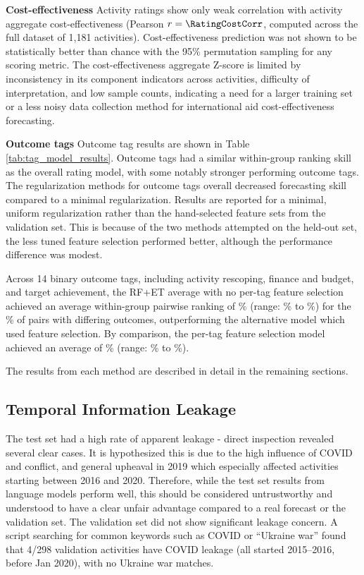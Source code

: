 \textbf{Cost-effectiveness} Activity ratings show only weak correlation with activity aggregate cost-effectiveness (Pearson $r = \RatingCostCorr$, computed across the full dataset of 1,181 activities). Cost-effectiveness prediction was not shown to be statistically better than chance with the 95\% permutation sampling for any scoring metric. The cost-effectiveness aggregate Z-score is limited by inconsistency in its component indicators across activities, difficulty of interpretation, and low sample counts, indicating a need for a larger training set or a less noisy data collection method for international aid cost-effectiveness forecasting.

\textbf{Outcome tags} Outcome tag results are shown in Table \ref{tab:tag_model_results}. Outcome tags had a similar within-group ranking skill as the overall rating model, with some notably stronger performing outcome tags. The regularization methods for outcome tags overall decreased forecasting skill compared to a minimal regularization. Results are reported for a minimal, uniform regularization rather than the hand-selected feature sets from the validation set. This is because of the two methods attempted on the held-out set, the less tuned feature selection performed better, although the performance difference was modest.

Across 14 binary outcome tags, including activity rescoping, finance and budget, and target achievement, the RF+ET average with no per-tag feature selection  achieved an average within-group pairwise ranking of \OutcomeTagPairwiseAvg\% (range: \OutcomeTagPairwiseMin\% to \OutcomeTagPairwiseMax\%) for the \DifferingOutcomePairsFrac\% of pairs with differing outcomes, outperforming the alternative model which used feature selection. By comparison, the per-tag feature selection model achieved an average of \OutcomeTagPairwiseAvgFeatSel\% (range: \OutcomeTagPairwiseMinFeatSel\% to \OutcomeTagPairwiseMaxFeatSel\%).

The results from each method are described in detail in the remaining sections.

\subsection{Temporal Information Leakage}

The test set had a high rate of apparent leakage - direct inspection revealed several clear cases. It is hypothesized this is due to the high influence of COVID and conflict, and general upheaval in 2019 which especially affected activities starting between 2016 and 2020. Therefore, while the test set results from language models perform well, this should be considered untrustworthy and understood to have a clear unfair advantage compared to a real forecast or the validation set. The validation set did not show significant leakage concern. A script searching for common keywords such as COVID or ``Ukraine war'' found that 4/298 validation activities have COVID leakage (all started 2015--2016, before Jan 2020), with no Ukraine war matches.


